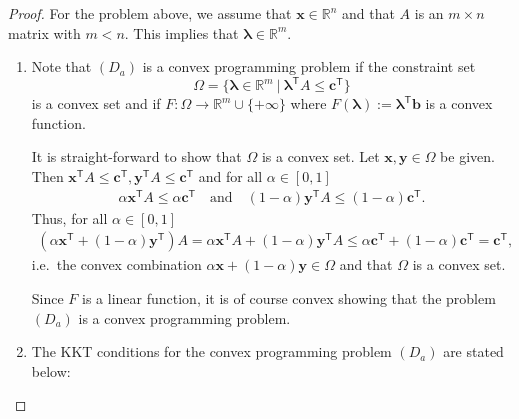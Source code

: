 \documentclass[12pt]{article}
\theoremstyle{definition}
\newcommand{\vc}[1]{\boldsymbol{#1}}
\newcommand{\tran}{\mathsf{T}}
\begin{document}
\begin{proof}
  For the problem above, we assume that $\vc{x} \in \mathbb{R}^n$ and that $A$ is an $m \times n$
  matrix with $m < n$. This implies that $\vc{\lambda} \in \mathbb{R}^m$.
  \begin{enumerate}
    \item Note that $(D_a)$ is a convex programming problem if the
      constraint set
      $$\Omega = \{\vc{\lambda} \in \mathbb{R}^m \ |\ \vc{\lambda}^\tran A \leq \vc{c}^\tran\}$$
      is a convex set and if $F: \Omega \to \mathbb{R}^m \cup \{+\infty\}$ where
      $F(\vc{\lambda}) := \vc{\lambda}^\tran \vc{b}$ is a convex function.

      It is straight-forward to show that $\Omega$ is a convex set. Let $\vc{x}, \vc{y} \in \Omega$ be given.
      Then $\vc{x}^\tran A \leq \vc{c}^\tran, \vc{y}^\tran A \leq \vc{c}^\tran$ and for all $\alpha \in [0,1]$
      \begin{align*}
        \alpha \vc{x}^\tran A \leq \alpha \vc{c}^\tran \quad \text{and} \quad (1 -\alpha)\vc{y}^\tran A \leq (1-\alpha)\vc{c}^\tran.
      \end{align*}
      Thus, for all $\alpha \in [0, 1]$
      \begin{align*}
        (\alpha\vc{x}^\tran + (1-\alpha)\vc{y}^\tran)A = \alpha \vc{x}^\tran A + (1-\alpha)\vc{y}^\tran A \leq \alpha \vc{c}^\tran + (1-\alpha)\vc{c}^\tran = \vc{c}^\tran,
      \end{align*}
      i.e.\ the convex combination $\alpha\vc{x} + (1-\alpha)\vc{y} \in \Omega$ and that $\Omega$ is a convex set.

      Since $F$ is a linear function, it is of course convex showing that the problem $(D_a)$ is a convex programming problem.
    \item The KKT conditions for the convex programming problem $(D_a)$ are stated below:


\end{enumerate}
\end{proof}
\end{document}
